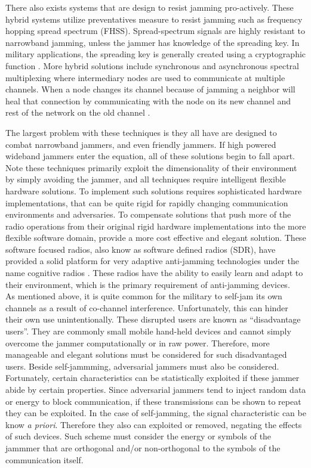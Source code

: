 There also exists systems that are design to resist jamming pro-actively.  These hybrid systems \cite{7} utilize preventatives measure to resist jamming such as frequency hopping spread spectrum (FHSS).  Spread-spectrum signals are highly resistant to narrowband jamming, unless the jammer has knowledge of the spreading key. In military applications, the spreading key is generally created using a cryptographic function \cite{sterling}.  More hybrid solutions include synchronous and asynchronous spectral multiplexing where intermediary nodes are used to communicate at multiple channels.  When a node changes its channel because of jamming a neighbor will heal that connection by communicating  with the node on its new channel and rest of the network on the old channel \cite{8}.


The largest problem with these techniques is they all have are designed to combat narrowband jammers, and even friendly jammers.  If high powered wideband jammers enter the equation, all of these solutions begin to fall apart.  Note these techniques primarily exploit the dimensionality of their environment by simply avoiding the jammer, and all techniques require intelligent flexible hardware solutions.   To implement such solutions requires sophisticated hardware implementations, that can be quite rigid for rapidly changing communication environments and adversaries.  To compensate solutions that push more of the radio operations from their original rigid hardware implementations into the more flexible software domain, provide a more cost effective and elegant solution.  These software focused radios, also know as software defined radios (SDR), have provided a solid platform for very adaptive anti-jamming technologies under the name cognitive radios \cite{sdr_jam}.  These radios have the ability to easily learn and adapt to their environment, which is the primary requirement of anti-jamming devices.\\

As mentioned above, it is quite common for the military to self-jam its own channels as a result of co-channel interference.  Unfortunately, this can hinder their own use unintentionally.  These disrupted users are known as ``disadvantage users''.  They are commonly small mobile hand-held devices and cannot simply overcome the jammer computationally or in raw power.  Therefore, more manageable and elegant solutions must be considered for such disadvantaged users.  Beside self-jammming, adversarial jammers must also be considered.  Fortunately, certain characteristics can be statistically exploited if these jammer abide by certain properties. Since adversarial jammers tend to inject random data or energy to block communication, if these transmissions can be shown to repeat they can be exploited.  In the case of self-jamming, the signal characteristic can be know \textit{a priori}.  Therefore they also can exploited or removed, negating the effects of such devices.  Such scheme must consider the energy or symbols of the jammmer that are orthogonal and/or non-orthogonal to the symbols of the communication itself.\\


